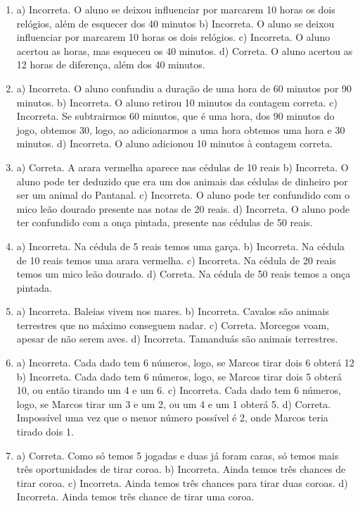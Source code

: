 \begin{enumerate}
\item
a) Incorreta. O aluno se deixou influenciar por marcarem 10 horas os
dois relógios, além de esquecer dos 40 minutos
b) Incorreta. O aluno se deixou influenciar por marcarem 10 horas os
dois relógios.
c) Incorreta. O aluno acertou as horas, mas esqueceu os 40 minutos.
d) Correta. O aluno acertou as 12 horas de diferença, além dos 40
minutos.

\item
a) Incorreta. O aluno confundiu a duração de uma hora de 60 minutos por
90 minutos.
b) Incorreta. O aluno retirou 10 minutos da contagem correta.
c) Incorreta. Se subtrairmos 60 minutos, que é uma hora, dos 90 minutos
do jogo, obtemos 30, logo, ao adicionarmos a uma hora obtemos uma hora e
30 minutos.
d) Incorreta. O aluno adicionou 10 minutos à contagem correta.

\item
a) Correta. A arara vermelha aparece nas cédulas de 10 reais
b) Incorreta. O aluno pode ter deduzido que era um dos animais das
cédulas de dinheiro por ser um animal do Pantanal.
c) Incorreta. O aluno pode ter confundido com o mico leão dourado
presente nas notas de 20 reais.
d) Incorreta. O aluno pode ter confundido com a onça pintada, presente
nas cédulas de 50 reais.

\item
a) Incorreta. Na cédula de 5 reais temos uma garça.
b) Incorreta. Na cédula de 10 reais temos uma arara vermelha.
c) Incorreta. Na cédula de 20 reais temos um mico leão dourado.
d) Correta. Na cédula de 50 reais temos a onça pintada.

\item
a) Incorreta. Baleias vivem nos mares.
b) Incorreta. Cavalos são animais terrestres que no máximo conseguem
nadar.
c) Correta. Morcegos voam, apesar de não serem aves.
d) Incorreta. Tamanduás são animais terrestres.

\item
a) Incorreta. Cada dado tem 6 números, logo, se Marcos tirar dois 6
obterá 12
b) Incorreta. Cada dado tem 6 números, logo, se Marcos tirar dois 5
obterá 10, ou então tirando um 4 e um 6.
c) Incorreta. Cada dado tem 6 números, logo, se Marcos tirar um 3 e um
2, ou um 4 e um 1 obterá 5.
d) Correta. Impossível uma vez que o menor número possível é 2, onde
Marcos teria tirado dois 1.

\item
a) Correta. Como só temos 5 jogadas e duas já foram caras, só temos mais
três oportunidades de tirar coroa.
b) Incorreta. Ainda temos três chances de tirar coroa.
c) Incorreta. Ainda temos três chances para tirar duas coroas.
d) Incorreta. Ainda temos três chance de tirar uma coroa.


\end{enumerate}
